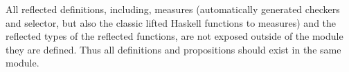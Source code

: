 All reflected definitions,
including, measures (automatically generated checkers and selector,
but also the classic lifted Haskell functions to measures)
and the reflected types of the reflected functions,
are not exposed outside of the module they are defined.
%
Thus all definitions and propositions should exist in the same module.
